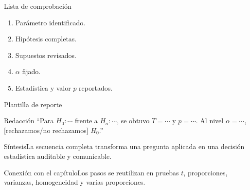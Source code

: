 \documentclass[10pt,aspectratio=169]{beamer}
\begin{document}
\begin{frame}{Lista de comprobación}\small\begin{enumerate}\item Parámetro identificado.\item Hipótesis completas.\item Supuestos revisados.\item $\alpha$ fijado.\item Estadística y valor $p$ reportados.\end{enumerate}\end{frame}
\begin{frame}{Plantilla de reporte}\small\begin{block}{Redacción} ``Para $H_0:\cdots$ frente a $H_a:\cdots$, se obtuvo $T=\cdots$ y $p=\cdots$. Al nivel $\alpha=\cdots$, [rechazamos/no rechazamos] $H_0$.''\end{block}\end{frame}
\begin{frame}{Síntesis}\small La secuencia completa transforma una pregunta aplicada en una decisión estadística auditable y comunicable.\end{frame}
\begin{frame}{Conexión con el capítulo}\small Los pasos se reutilizan en pruebas $t$, proporciones, varianzas, homogeneidad y varias proporciones.\end{frame}
\end{document}
